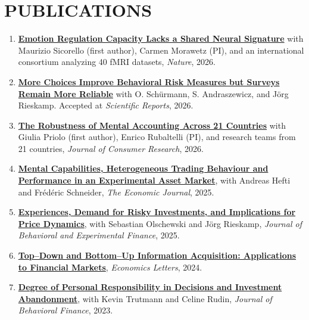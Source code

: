 \documentclass[10pt]{article}
\begin{document}
\section*{PUBLICATIONS}
\begin{enumerate}
\item[10.] \href{https://www.nature.com/articles/s41586-026-11203-1}{\textbf{Emotion Regulation Capacity Lacks a Shared Neural Signature}}
with Maurizio Sicorello (first author), Carmen Morawetz (PI), and an international consortium analyzing
40 fMRI datasets, \textit{Nature}, 2026.

\item[9.] \href{https://tinyurl.com/2v4sk3vz}{\textbf{More Choices Improve Behavioral Risk Measures but Surveys Remain More Reliable}}
with O. Sch\"{u}rmann, S. Andraszewicz, and J\"{o}rg Rieskamp. Accepted at \textit{Scientific Reports}, 2026. %

\item[8.] \href{https://academic.oup.com/jcr/advance-article/doi/10.1093/jcr/ucag022/8732294}{\textbf{The Robustness of Mental Accounting Across 21 Countries}} with Giulia Priolo (first author), Enrico
Rubaltelli (PI), and research teams from 21 countries, \textit{Journal of Consumer Research}, 2026.

\item[7.] \href{https://academic.oup.com/ej/article-abstract/135/671/2161/8087333}{\textbf{Mental Capabilities, Heterogeneous Trading Behaviour and Performance in an Experimental
Asset Market}}, with Andreas Hefti and Fr\'{e}d\'{e}ric Schneider, \textit{The Economic Journal}, 2025.

\item[6.] \href{https://www.sciencedirect.com/science/article/pii/S2214635024000546}{\textbf{Experiences, Demand for Risky Investments, and Implications for Price Dynamics}}, with
Sebastian Olschewski and J\"{o}rg Rieskamp, \textit{Journal of Behavioral and Experimental Finance}, 2025.

\item[5.] \href{https://www.sciencedirect.com/science/article/pii/S0165176524001009}{\textbf{Top--Down and Bottom--Up Information Acquisition: Applications to Financial Markets}},
\textit{Economics Letters}, 2024.

\item[4.] \href{https://www.tandfonline.com/doi/full/10.1080/15427560.2023.2228549}{\textbf{Degree of Personal Responsibility in Decisions and Investment Abandonment}}, with Kevin
Trutmann and Celine Rudin, \textit{Journal of Behavioral Finance}, 2023.


\end{enumerate}
\end{document}
